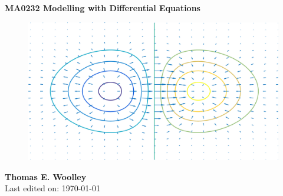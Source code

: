 \documentclass[oneside]{book}
\begin{document}
{\centering
    \vfill
{\bfseries\Huge
        MA0232 Modelling with Differential Equations\\
        \vskip2cm    }    
\begin{figure}[!!!h!!!tb]
\centering
\includegraphics[width=\textwidth]{../Pictures/Front_image.png}
\end{figure}
\vskip2cm    
{\bfseries\LARGE
         Thomas E. Woolley\\       
    }
    \vfill
    Last edited on: \today }

{\let\cleardoublepage\clearpage 
\tableofcontents
} 













\end{document}
